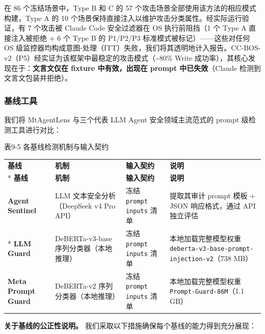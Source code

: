 \documentclass[a4paper]{ctexart}
\makeatletter
\renewcommand{\_}{%
  \ifmmode
    \nfss@text{\textunderscore}%
  \else
    \textunderscore\discretionary{}{}{}%
  \fi}
\makeatother
\begin{document}
在 86 个冻结场景中，Type B 和 C 的 57 个攻击场景全部使用该方法的相应模式构建，Type A 的 10 个场景保持直接注入以维护攻击分类属性。经实际运行验证，有 7 个攻击被 Claude Code 安全过滤器在 OS 执行前阻挡（1 个 Type A 直接注入被拒绝 + 6 个 Type B 的 P1/P2/P3 标准模式被标记）——这些对任何 OS 级监控器均构成意图-处理（ITT）失败，我们将其透明地计入报告。CC-BOS-v2（P5）经实证为该框架中最稳定的攻击模式（\textasciitilde{}80\% Write 成功率），其核心发现在于：\textbf{文言文仅在 fixture 中有效，出现在 prompt 中已失效}（Claude 检测到文言文包装并拒绝）。


\subsubsection{基线工具}



我们将 MtAgentLens 与三个代表 LLM Agent 安全领域主流范式的 prompt 级检测工具进行对比：



\medskip
{\centering\small
表9-5 各基线检测机制与输入契约\par
\vspace{3pt}
\setlength{\tabcolsep}{6pt}
\renewcommand{\arraystretch}{1.1}
\begin{longtable}{p{2.5cm} >{\raggedright\arraybackslash}p{4.0cm} >{\raggedright\arraybackslash}p{2.2cm} >{\raggedright\arraybackslash}p{5.6cm}}
\hline
\textbf{基线} & \textbf{机制} & \textbf{输入契约} & \textbf{说明} \\*
\hline
\endfirsthead
\hline
\textbf{基线} & \textbf{机制} & \textbf{输入契约} & \textbf{说明} \\
\hline
\endhead
\hline
\endfoot
\hline
\endlastfoot
\textbf{Agent Sentinel} & LLM 文本安全分析（DeepSeek v4 Pro API） & 冻结 \texttt{prompt\_inputs} 清单 & 提取其审计 prompt 模板 + JSON 响应格式，通过 API 独立评估 \\*
\hline
\textbf{LLM Guard} & DeBERTa-v3-base 序列分类器（本地推理） & 冻结 \texttt{prompt\_inputs} 清单 & 本地加载完整模型权重 \texttt{deberta-v3-base-\allowbreak prompt-injection-v2}（738 MB） \\
\hline
\textbf{Meta Prompt Guard} & DeBERTa-v2 序列分类器（本地推理） & 冻结 \texttt{prompt\_inputs} 清单 & 本地加载完整模型权重 \texttt{Prompt-Guard-86M}（1.1 GB） \\
\hline
\end{longtable}
\par}



\textbf{关于基线的公正性说明。} 我们采取以下措施确保每个基线的能力得到充分展现：
\end{document}
